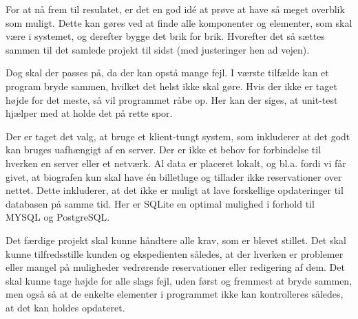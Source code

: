 For at nå frem til resulatet, er det en god idé at prøve at have så meget overblik som muligt. Dette kan gøres ved at finde alle komponenter og elementer, som skal være i systemet, og derefter bygge det brik for brik. Hvorefter det så sættes sammen til det samlede projekt til sidst (med justeringer hen ad vejen).

Dog skal der passes på, da der kan opstå mange fejl. I værste tilfælde kan et program bryde sammen, hvilket det helst ikke skal gøre. Hvis der ikke er taget højde for det meste, så vil programmet råbe op. Her kan der siges, at unit-test hjælper med at holde det på rette spor. 

Der er taget det valg, at bruge et klient-tungt system, som inkluderer at det godt kan bruges uafhængigt af en server. Der er ikke et behov for forbindelse til hverken en server eller et netværk. Al data er placeret lokalt, og bl.a. fordi vi får givet, at biografen kun skal have én billetluge og tillader ikke reservationer over nettet. Dette inkluderer, at det ikke er muligt at lave forskellige opdateringer til databasen på samme tid. Her er SQLite en optimal mulighed i forhold til MYSQL og PostgreSQL.

Det færdige projekt skal kunne håndtere alle krav, som er blevet stillet. Det skal kunne tilfredsstille kunden og ekspedienten således, at der hverken er problemer eller mangel på muligheder vedrørende reservationer eller redigering af dem. Det skal kunne tage højde for alle slags fejl, uden først og fremmest at bryde sammen, men også så at de enkelte elementer i programmet ikke kan kontrolleres således, at det kan holdes opdateret.
